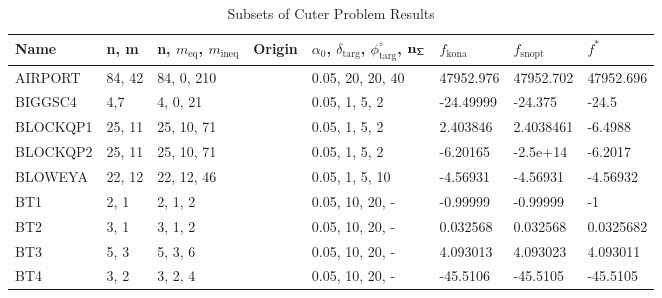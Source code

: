 \begin{landscape}
\begin{longtable}{l | l |  l  |  >{\footnotesize}p{3cm} | l | l | l | l  }      %
\caption{Subsets of Cuter Problem Results}\label{tab:cuter} \\
 \hline 
Name   &                 n,   m       &  n,  $m_{\text{eq}}$,  $m_{\text{ineq}}$        &     Origin      &\textbf{$\alpha_0$},  $\delta_{\text{targ}}$, $\phi^{\circ}_{\text{targ}}$,  $\mathbf{{n_{\mathsf{\Sigma}}}}$      & $ f_{\text{kona}} $   & $ f_{\text{snopt}} $ &$ f^*$    \\ \hline
AIRPORT   &  84, 42  &  84, 0, 210  &    &  0.05, 20, 20, 40 & 47952.976  & 47952.702  & 47952.696   \\ \hline
BIGGSC4   & 4,7  &  4, 0, 21  &    & 0.05, 1, 5, 2  &  -24.49999  & -24.375   & -24.5    \\ \hline
BLOCKQP1 &  25, 11 &  25, 10, 71  &     & 0.05, 1, 5, 2 & 2.403846   & 2.4038461  &  -6.4988    \\ \hline
BLOCKQP2 &  25, 11 &  25, 10, 71  &     & 0.05, 1, 5, 2 & -6.20165    & -2.5e+14  & -6.2017    \\ \hline
BLOWEYA  &  22, 12 &  22, 12, 46  &      &   0.05, 1, 5, 10  & -4.56931  & -4.56931   & -4.56932   \\ \hline
BT1    & 2, 1   &  2, 1, 2  & &  0.05, 10, 20, -    &  -0.99999  & -0.99999   & -1   \\ \hline
BT2    & 3, 1   & 3, 1, 2  & & 0.05, 10, 20, -   & 0.032568  &  0.032568  & 0.0325682  \\ \hline
BT3    & 5, 3   & 5, 3, 6 & & 0.05, 10, 20, -   &  4.093013  &  4.093023  & 4.093011 \\ \hline
BT4   &   3, 2  &   3, 2, 4 & & 0.05, 10, 20, -   & -45.5106  &  -45.5105  & -45.5105  \\ \hline

\end{longtable}
\end{landscape}
